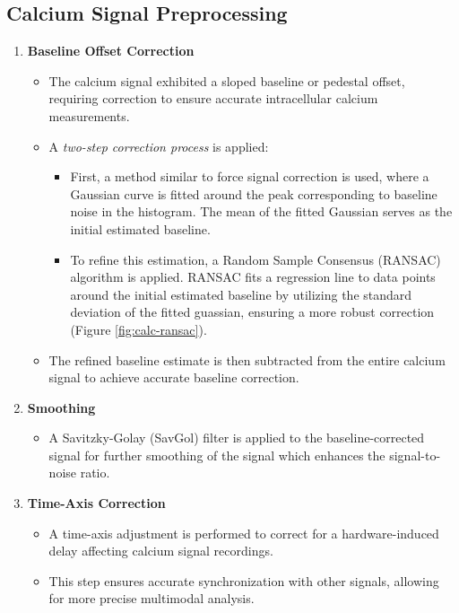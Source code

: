 \documentclass{report}
\begin{document}
    \newpage
    \subsection{Calcium Signal Preprocessing}
    \label{sec:calc-prep}

    \begin{enumerate}
        \item \textbf{Baseline Offset Correction}  
        \begin{itemize}
            \item The calcium signal exhibited a sloped baseline or pedestal offset, requiring correction to ensure accurate intracellular calcium measurements.
            \item A \textit{two-step correction process} is applied:
            \begin{itemize}
                \item First, a method similar to force signal correction is used, where a Gaussian curve is fitted around the peak corresponding to baseline noise in the histogram. The mean of the fitted Gaussian serves as the initial estimated baseline.
                \item To refine this estimation, a Random Sample Consensus (RANSAC) algorithm is applied. RANSAC fits a regression line to data points around the initial estimated baseline by utilizing the standard deviation of the fitted guassian, ensuring a more robust correction (Figure \ref{fig:calc-ransac}).
            \end{itemize}
            \item The refined baseline estimate is then subtracted from the entire calcium signal to achieve accurate baseline correction.
        \end{itemize}
    
        \item \textbf{Smoothing}  
        \begin{itemize}
            \item A Savitzky-Golay (SavGol) filter is applied to the baseline-corrected signal for further smoothing of the signal which enhances the signal-to-noise ratio.
        \end{itemize}
    
        \item \textbf{Time-Axis Correction}  
        \begin{itemize}
            \item A time-axis adjustment is performed to correct for a hardware-induced delay affecting calcium signal recordings.
            \item This step ensures accurate synchronization with other signals, allowing for more precise multimodal analysis.
        \end{itemize}
    \end{enumerate}
    
\end{document}
